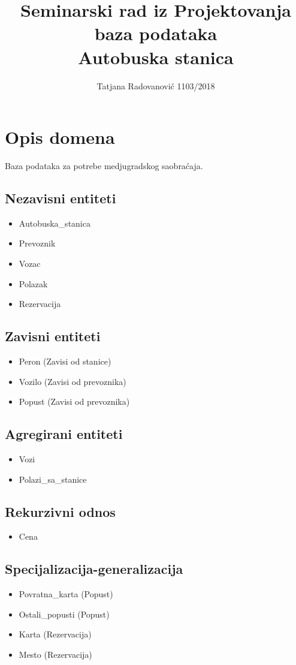 \documentclass[12pt]{article}
\title{Seminarski rad iz Projektovanja baza podataka \\ Autobuska stanica}
\author{Tatjana Radovanovi\'c 1103/2018}
\begin{document}
\maketitle 

\newpage

\section{Opis domena}
Baza podataka za potrebe medjugradskog saobra\'caja. 

\subsection{Nezavisni entiteti}
\begin{itemize}
	\item Autobuska\_stanica
	\item Prevoznik
	\item Vozac
	\item Polazak
	\item Rezervacija
\end{itemize}

\subsection{Zavisni entiteti}
\begin{itemize}
	\item Peron (Zavisi od stanice)
	\item Vozilo (Zavisi od prevoznika)
	\item Popust (Zavisi od prevoznika)
\end{itemize}

\subsection{Agregirani entiteti}
\begin{itemize}
	\item Vozi
	\item Polazi\_sa\_stanice
\end{itemize}

\subsection{Rekurzivni odnos}
\begin{itemize}
	\item Cena
\end{itemize}

\subsection{Specijalizacija-generalizacija}
\begin{itemize}
	\item Povratna\_karta (Popust)
	\item Ostali\_popusti (Popust)
	\item Karta (Rezervacija)
	\item Mesto (Rezervacija)
\end{itemize}
\end{document}
